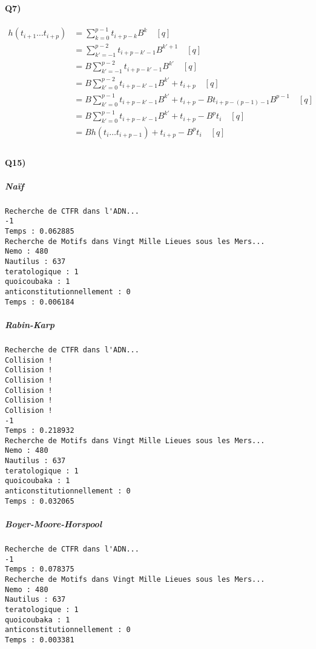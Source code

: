 \documentclass{article}
\begin{document}
\paragraph{Q7)}

\begin{align*}
h(t_{i+1} \dots t_{i+p}) &= \sum_{k=0}^{p-1} t_{i+p-k} B^{k} \hspace{1em} [q] \\
                         &= \sum_{k'=-1}^{p-2} t_{i+p-k'-1} B^{k'+1} \hspace{1em} [q] \\
                         &= B\sum_{k'=-1}^{p-2} t_{i+p-k'-1} B^{k'} \hspace{1em} [q] \\
                         &= B\sum_{k'=0}^{p-2} t_{i+p-k'-1} B^{k'} + t_{i+p} \hspace{1em} [q] \\
                         &= B\sum_{k'=0}^{p-1} t_{i+p-k'-1} B^{k'} + t_{i+p} - Bt_{i+p-(p-1)-1}B^{p-1} \hspace{1em} [q] \\
                         &= B\sum_{k'=0}^{p-1} t_{i+p-k'-1} B^{k'} + t_{i+p} - B^pt_{i} \hspace{1em} [q] \\
                         &= Bh(t_{i} \dots t_{i+p-1}) + t_{i+p} - B^pt_{i} \hspace{1em} [q] \\
\end{align*}

\paragraph{Q15)}

\subparagraph{Naïf}
\begin{lstlisting}
Recherche de CTFR dans l'ADN...
-1
Temps : 0.062885
Recherche de Motifs dans Vingt Mille Lieues sous les Mers...
Nemo : 480
Nautilus : 637
teratologique : 1
quoicoubaka : 1
anticonstitutionnellement : 0
Temps : 0.006184
\end{lstlisting}

\subparagraph{Rabin-Karp}
\begin{lstlisting}
Recherche de CTFR dans l'ADN...
Collision !
Collision !
Collision !
Collision !
Collision !
Collision !
-1
Temps : 0.218932
Recherche de Motifs dans Vingt Mille Lieues sous les Mers...
Nemo : 480
Nautilus : 637
teratologique : 1
quoicoubaka : 1
anticonstitutionnellement : 0
Temps : 0.032065
\end{lstlisting}

\subparagraph{Boyer-Moore-Horspool}
\begin{lstlisting}
Recherche de CTFR dans l'ADN...
-1
Temps : 0.078375
Recherche de Motifs dans Vingt Mille Lieues sous les Mers...
Nemo : 480
Nautilus : 637
teratologique : 1
quoicoubaka : 1
anticonstitutionnellement : 0
Temps : 0.003381
\end{lstlisting}
\end{document}
